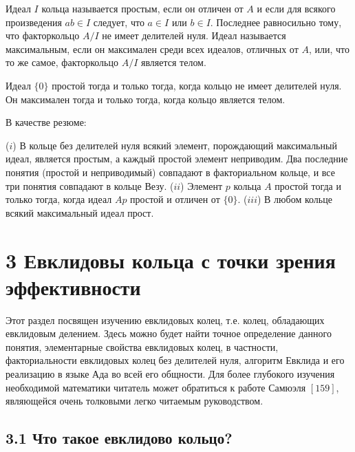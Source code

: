 \begin{determ}
\textit{\indent}Идеал $I$ кольца называется простым, если он отличен от $A$ и если для всякого произведения $ab \in I$ следует, что $a \in I$ или $b \in I$. Последнее равносильно тому, что факторкольцо $A/I$ не имеет делителей нуля. \newline \indent Идеал называется максимальным, если он максимален среди всех идеалов, отличных от $A$, или, что то же самое, факторкольцо $A/I$ является телом.
\end{determ}

\begin{mynotice}
Идеал $\{0\}$ простой тогда и только тогда, когда кольцо не имеет делителей нуля. Он максимален тогда и только тогда, когда кольцо является телом.
\end{mynotice}

\newpage
\indent В качестве резюме:

\begin{predl}
\textit{\indent} ($i$) В кольце без делителей нуля всякий элемент, порождающий максимальный идеал, является простым, а каждый простой элемент неприводим. Два последние понятия (простой и неприводимый) совпадают в факториальном кольце, и все три понятия совпадают в кольце Везу. \newline \indent ($ii$) Элемент $p$ кольца $A$ простой тогда и только тогда, когда идеал $Ap$ простой и отличен от $\{0\}$. \newline \indent ($iii$) В любом кольце всякий максимальный идеал прост.
\end{predl}

\section{3 Евклидовы кольца с точки зрения эффективности}

Этот раздел посвящен изучению евклидовых колец, т.е. колец, обладающих евклидовым делением. Здесь можно будет найти точное определение данного понятия, элементарные свойства евклидовых колец, в частности, факториальности евклидовых колец без делителей нуля, алгоритм Евклида и его реализацию в языке Ада во всей его общности. Для более глубокого изучения необходимой математики читатель может обратиться к работе Самюэля $[159]$, являющейся очень толковыми легко читаемым руководством.

\subsection{3.1 Что такое евклидово кольцо?}

